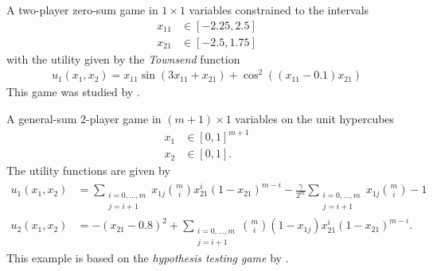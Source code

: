 \noindent
\begin{minipage}[c]{0.6\textwidth}
\begin{game}\label{ex.adam21.townsend}
A two-player zero-sum game in $1 \times 1$ variables constrained to the intervals
\begin{align*}
x_{11} &\in [-2.25,2.5]\\
x_{21} &\in [-2.5,1.75]
\end{align*}
with the utility given by the \emph{Townsend} function
\begin{align*}
u_1(x_{1}, x_{2}) = x_{11} \sin\left( 3 x_{11} + x_{21} \right) + \cos^{2}\left( \left(x_{11}-0.1 \right) x_{21} \right)
\end{align*}
This game was studied by \textcite[Townsend]{adam.horčík.ea:double}.
\end{game}
\strut
\end{minipage}
\hfill
\begin{minipage}[c]{0.35\textwidth}
\end{minipage}


\begin{game}\label{ex.yasodharan19}
A general-sum 2-player game in $(m+1) \times 1$ variables on the unit hypercubes
\begin{align*}
    x_1 &\in [0,1]^{m+1}\\
    x_2 &\in [0,1].
\end{align*}
The utility functions are given by
\begin{align*}
u_1(x_1, x_2) &= \sum_{\substack{i=0,\dots,m\\j=i+1}} x_{1j} \binom{m}{i} x_{21}^i (1 - x_{21})^{m - i} - \frac{\gamma}{2^m} \sum_{\substack{i=0,\dots,m\\j=i+1}} x_{1j} \binom{m}{i} - 1 \\
u_2(x_1, x_2) &= - (x_{21} - 0.8)^2 + \sum_{\substack{i=0,\dots,m\\j=i+1}} \binom{m}{i} (1 - x_{1j}) x_{21}^i (1 - x_{21})^{m - i}.
\end{align*}
This example is based on the \emph{hypothesis testing game} by \textcite{yasodharan.loiseau:nonzero-sum}.
\end{game}


